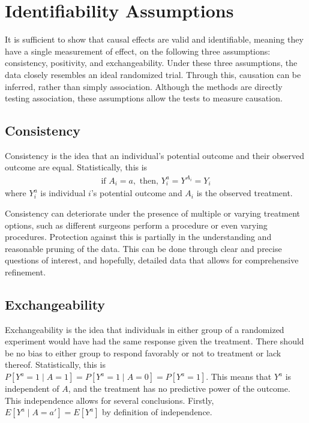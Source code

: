 \section{Identifiability Assumptions} \label{assumptions} 
It is sufficient to show that causal effects are valid and identifiable, meaning they have a single measurement of effect, on the following three assumptions: consistency, positivity, and exchangeability.\cite{cole2009consistency, hernan_robins_2016}   Under these three assumptions, the data closely resembles an ideal randomized trial.  Through this, causation can be inferred, rather than simply association.  Although the methods are directly testing association, these assumptions allow the tests to measure causation.  
 
\subsection{Consistency} 
Consistency is the idea that an individual's potential outcome and their observed outcome are equal\cite{cole2009consistency, hernan_robins_2016}.  Statistically, this is 
\begin{align} 
\text{if  } A_i = a, \text{     then,    } Y_i^a = Y^{A_i} = Y_i 
\end{align} 
where $Y_i^a$ is individual $i$'s potential outcome and $A_i$ is the observed treatment.  

Consistency can deteriorate under the presence of multiple or varying treatment options, such as different surgeons perform a procedure or even varying procedures.  Protection against this is partially in the understanding and reasonable pruning of the data.  This can be done through clear and precise questions of interest, and hopefully, detailed data that allows for comprehensive refinement.  

\subsection{Exchangeability} \label{exchangeability} 
Exchangeability is the idea that individuals in either group of a randomized experiment would have had the same response given the treatment. \cite{hernan_robins_2016}  There should be no bias to either group to respond favorably or not to treatment or lack thereof.  
Statistically, this is $P[Y^a = 1 \mid A = 1] = P[Y^a = 1 \mid A = 0] = P[Y^a = 1]$.  This means that $Y^a$ is independent of $A$, and the treatment has no predictive power of the outcome.  This independence allows for several conclusions.  Firstly, $E[Y^a \mid A = a'] = E[Y^a]$ by definition of independence.  

